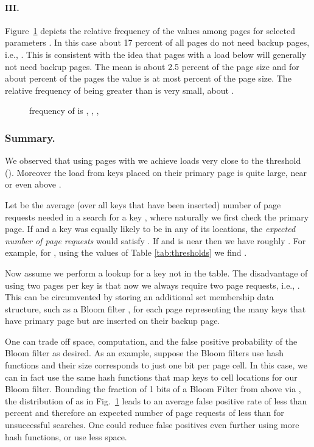 \let\accentvec\vec \documentclass{llncs}
\newcommand{\ie}{i.e.}
\newcommand{\imgScale}{0.58}
\newcommand{\figPath}{.}
\begin{document}
\paragraph{III.}
Figure~\ref{fig:moved_keys_per_page} depicts the relative frequency of the values  among  pages for selected parameters . In this case about 17 percent of all pages do not need backup pages, \ie, . This is consistent with the idea that pages with a load below  will generally not need backup pages. The mean  is about 2.5 percent of the page size  and for about  percent of the pages the value  is at most  percent of the page size. The relative frequency of  being greater than  is very small, about .
\begin{figure}
\centering
\scalebox{\imgScale}{}
\vspace{-0.1cm}
\caption{\label{fig:moved_keys_per_page}frequency of  is , , , }
\end{figure}
 
\subsubsection{Summary.}
\label{sec:page_request}
We observed that using pages with  we achieve loads very close to the  threshold ().
Moreover the load  from keys placed on their primary page  is quite large, near or even
above .

Let  be the average (over all keys that have been inserted) number of page requests needed in a search for a key ,
where naturally we first check the primary page.
If  and a key was equally likely to be in any of its locations, 
the \emph{expected number of page requests}  would satisfy .
If  and  is near  then we have roughly .
For example, for , using the values of Table \ref{tab:thresholds} we find .



Now assume we perform a lookup for a key  not in the table. The
disadvantage of using two pages per key is that now we always require two
page requests, \ie, . This can be circumvented by
storing an additional set membership data structure, such as a Bloom
filter \cite{Bloom1970}, for each page  representing the  many
keys that have primary page  but are inserted on their backup page.

One can trade off space, computation, and the false positive
probability of the Bloom filter as desired.  As an example, suppose
the Bloom filters use  hash functions and their size corresponds to
just one bit per page cell. In this case, we can in fact use the same
hash functions that map keys to cell locations for our Bloom filter.
Bounding the fraction of 1 bits of a Bloom Filter
from above via , the distribution of  as in
Fig.~\ref{fig:moved_keys_per_page} leads to an average false positive
rate of less than  percent and therefore an expected number of page
requests  of less than  for unsuccessful searches.  One could
reduce false positives even further using more hash functions, or use
less space.
\end{document}
